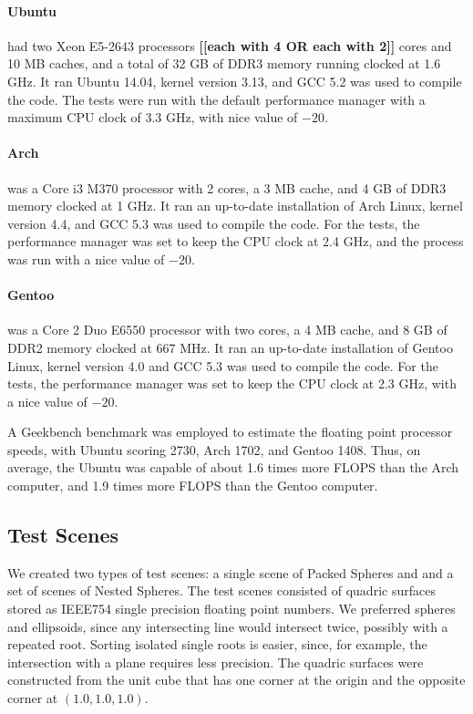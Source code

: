 \documentclass{cccg16}
\def\Jack#1{{\bf [[#1]]}\ignorespaces}
\begin{document}
\paragraph{Ubuntu} had  two Xeon E5-2643 processors \Jack{each with 4 OR each with 2} cores and 
10 MB caches, and a total of 32 GB of DDR3 memory running
clocked at 1.6 GHz.  It  ran Ubuntu 14.04, kernel version 3.13, and GCC 5.2 was used to compile the code.
The tests were run with the default performance manager with a
maximum CPU clock of 3.3 GHz, with nice value of $-20$.

\paragraph{Arch} was 
a Core i3 M370 processor with 2 cores, a 3 MB cache, and 4 GB of DDR3
memory clocked at 1 GHz.  It ran an up-to-date installation of Arch Linux, kernel version 4.4, and
GCC 5.3 was used to compile the code.  For the tests, the performance
manager was set to keep the CPU clock at 2.4 GHz, and the process was
run with a nice value of $-20$.

\paragraph{Gentoo} was a Core 2 Duo E6550 processor with two cores,
a 4 MB cache, and 8 GB of DDR2 memory clocked at 667 MHz.  It ran an
up-to-date installation of Gentoo Linux, kernel version 4.0 and GCC
5.3 was used to compile the code.  For the tests, the performance
manager was set to keep the CPU clock at 2.3 GHz, with a nice value of
$-20$.

A Geekbench benchmark was employed to estimate the floating point
processor speeds, with Ubuntu scoring 2730, Arch 1702, and Gentoo
1408. Thus, on average, the Ubuntu was capable of about 1.6 times more
FLOPS than the Arch computer, and 1.9 times more FLOPS than the Gentoo
computer.


\subsection{Test Scenes}
We created two types of test scenes: a single scene of Packed Spheres
and and a set of scenes of Nested Spheres.  The test scenes consisted
of quadric surfaces stored as IEEE754 single precision floating point
numbers.  We preferred spheres and ellipsoids, since any intersecting
line would intersect twice, possibly with a repeated root.  Sorting
isolated single roots is easier, since, for example, the intersection
with a plane requires less precision. The quadric surfaces were constructed 
from the unit cube that has one corner at the origin and the
opposite corner at $(1.0, 1.0, 1.0)$.
\end{document}
